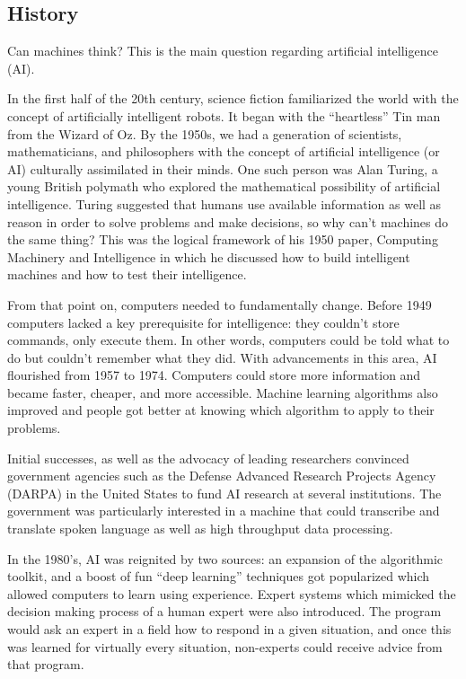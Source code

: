 \subsection{History}
Can machines think? This is the main question regarding artificial intelligence (AI).

In the first half of the 20th century, science fiction familiarized the world with the concept of artificially intelligent robots. It began with the “heartless” Tin man from the Wizard of Oz. By the 1950s, we had a generation of scientists, mathematicians, and philosophers with the concept of artificial intelligence (or AI) culturally assimilated in their minds. One such person was Alan Turing, a young British polymath who explored the mathematical possibility of artificial intelligence. Turing suggested that humans use available information as well as reason in order to solve problems and make decisions, so why can’t machines do the same thing? This was the logical framework of his 1950 paper, Computing Machinery and Intelligence \citep{TuringComputingMachineryIntelligence2009} in which he discussed how to build intelligent machines and how to test their intelligence.

From that point on, computers needed to fundamentally change. Before 1949 computers lacked a key prerequisite for intelligence: they couldn’t store commands, only execute them. In other words, computers could be told what to do but couldn’t remember what they did. With advancements in this area, AI flourished from 1957 to 1974. Computers could store more information and became faster, cheaper, and more accessible. Machine learning algorithms also improved and people got better at knowing which algorithm to apply to their problems.

Initial successes, as well as the advocacy of leading researchers convinced government agencies such as the Defense Advanced Research Projects Agency (DARPA) in the United States to fund AI research at several institutions. The government was particularly interested in a machine that could transcribe and translate spoken language as well as high throughput data processing.

In the 1980’s, AI was reignited by two sources: an expansion of the algorithmic toolkit, and a boost of fun \enquote{deep learning} techniques got popularized which allowed computers to learn using experience. Expert systems which mimicked the decision making process of a human expert were also introduced. The program would ask an expert in a field how to respond in a given situation, and once this was learned for virtually every situation, non-experts could receive advice from that program.

